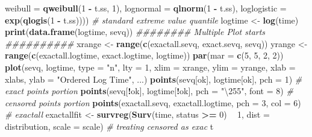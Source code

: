 \documentclass[
]{article}
\newenvironment{Shaded}{\begin{snugshade}}{\end{snugshade}}
\newcommand{\CommentTok}[1]{\textcolor[rgb]{0.56,0.35,0.01}{\textit{#1}}}
\newcommand{\DataTypeTok}[1]{\textcolor[rgb]{0.13,0.29,0.53}{#1}}
\newcommand{\DecValTok}[1]{\textcolor[rgb]{0.00,0.00,0.81}{#1}}
\newcommand{\KeywordTok}[1]{\textcolor[rgb]{0.13,0.29,0.53}{\textbf{#1}}}
\newcommand{\NormalTok}[1]{#1}
\newcommand{\OperatorTok}[1]{\textcolor[rgb]{0.81,0.36,0.00}{\textbf{#1}}}
\newcommand{\StringTok}[1]{\textcolor[rgb]{0.31,0.60,0.02}{#1}}
\begin{document}
\begin{Shaded}
\begin{Highlighting}[]
{{{{{{{{{{{{{{{{{{                       \DataTypeTok{weibull =} \KeywordTok{qweibull}\NormalTok{(}\DecValTok{1} \OperatorTok{-}\StringTok{ }\NormalTok{t.ss, }\DecValTok{1}\NormalTok{),}
                       \DataTypeTok{lognormal =} \KeywordTok{qlnorm}\NormalTok{(}\DecValTok{1} \OperatorTok{-}\StringTok{ }\NormalTok{t.ss),}
                       \DataTypeTok{loglogistic =} \KeywordTok{exp}\NormalTok{(}\KeywordTok{qlogis}\NormalTok{(}\DecValTok{1} \OperatorTok{-}\StringTok{ }\NormalTok{t.ss))))}
    \CommentTok{# standard extreme value quantile}
\NormalTok{    logtime <-}\StringTok{ }\KeywordTok{log}\NormalTok{(time)}
    \KeywordTok{print}\NormalTok{(}\KeywordTok{data.frame}\NormalTok{(logtime, sevq))}
    \CommentTok{######## Multiple Plot starts ##########}
\NormalTok{    xrange <-}\StringTok{ }\KeywordTok{range}\NormalTok{(}\KeywordTok{c}\NormalTok{(exactall.sevq, exact.sevq, sevq))}
\NormalTok{    yrange <-}\StringTok{ }\KeywordTok{range}\NormalTok{(}\KeywordTok{c}\NormalTok{(exactall.logtime, exact.logtime, logtime))}
    \KeywordTok{par}\NormalTok{(}\DataTypeTok{mar =} \KeywordTok{c}\NormalTok{(}\DecValTok{5}\NormalTok{, }\DecValTok{5}\NormalTok{, }\DecValTok{2}\NormalTok{, }\DecValTok{2}\NormalTok{))}
    \KeywordTok{plot}\NormalTok{(sevq, logtime, }\DataTypeTok{type =} \StringTok{"n"}\NormalTok{, }\DataTypeTok{lty =} \DecValTok{1}\NormalTok{, }\DataTypeTok{xlim =}\NormalTok{ xrange, ylim}
\NormalTok{         =}\StringTok{ }\NormalTok{yrange, }\DataTypeTok{xlab =}\NormalTok{ xlabs, }\DataTypeTok{ylab =} \StringTok{"Ordered Log Time"}\NormalTok{,}
\NormalTok{         ...)}
    \KeywordTok{points}\NormalTok{(sevq[ok], logtime[ok], }\DataTypeTok{pch =} \DecValTok{1}\NormalTok{)}
    \CommentTok{# exact points portion}
    \KeywordTok{points}\NormalTok{(sevq[}\OperatorTok{!}\NormalTok{ok], logtime[}\OperatorTok{!}\NormalTok{ok], }\DataTypeTok{pch =} \StringTok{"\textbackslash{}255"}\NormalTok{, }\DataTypeTok{font =} \DecValTok{8}\NormalTok{)}
    \CommentTok{# censored points portion}
    \KeywordTok{points}\NormalTok{(exactall.sevq, exactall.logtime, }\DataTypeTok{pch =} \DecValTok{3}\NormalTok{, }\DataTypeTok{col =} \DecValTok{6}\NormalTok{)}
    \CommentTok{# exactall}
\NormalTok{    exactallfit <-}\StringTok{ }\KeywordTok{survreg}\NormalTok{(}\KeywordTok{Surv}\NormalTok{(time, status }\OperatorTok{>=}\StringTok{ }\DecValTok{0}\NormalTok{) }\OperatorTok{~}\StringTok{ }\DecValTok{1}\NormalTok{, }\DataTypeTok{dist =} 
\NormalTok{                             distribution, }\DataTypeTok{scale =}\NormalTok{ scale)}
    \CommentTok{# treating censored as exac}
\NormalTok{    t}
}}}}}}}}}}}}}}}}}}
\end{Highlighting}
\end{Shaded}
\end{document}
